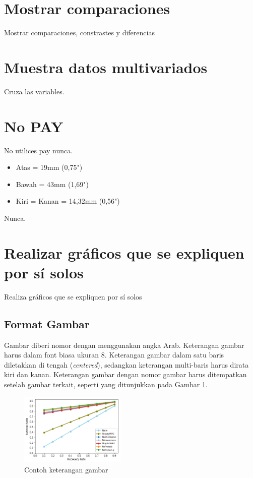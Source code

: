 \documentclass[conference, a4paper]{IEEEtran_ID}
\begin{document}
\section{Mostrar comparaciones}

Mostrar comparaciones, constrastes y diferencias

\section{Muestra datos multivariados}

Cruza las variables. 

\section{No PAY}

No utilices pay nunca. 

\begin{itemize}
	\item Atas = 19mm (0,75")
	\item Bawah = 43mm (1,69")
	\item Kiri = Kanan = 14,32mm (0,56")
\end{itemize}
	
Nunca. 

\section{Realizar gráficos que se expliquen por sí solos}


Realiza gráficos que se expliquen por sí solos 
\subsection{Format Gambar}
	
	Gambar diberi nomor dengan menggunakan angka Arab. Keterangan gambar harus dalam font biasa ukuran 8. Keterangan gambar dalam satu baris diletakkan di tengah (\textit{centered}), sedangkan keterangan multi-baris harus dirata kiri dan kanan. Keterangan gambar dengan nomor gambar harus ditempatkan setelah gambar terkait, seperti yang ditunjukkan pada Gambar \ref{fig_sample}.

	\begin{figure}[htbp]
		\centerline{\includegraphics[width=0.45\textwidth]{figure.png}}
		\caption{Contoh keterangan gambar}
		\label{fig_sample}
	\end{figure}
\end{document}
